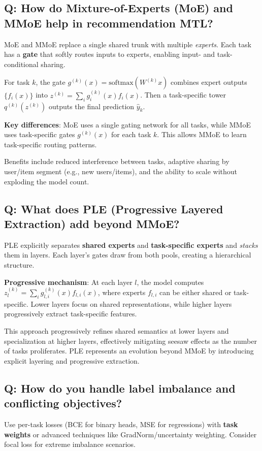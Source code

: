 \subsection*{Q: How do Mixture-of-Experts (MoE) and MMoE help in recommendation MTL?}
MoE and MMoE replace a single shared trunk with multiple \emph{experts}. Each task has a \textbf{gate} that softly routes inputs to experts, enabling input- and task-conditional sharing.

For task $k$, the gate $g^{(k)}(x)=\mathrm{softmax}(W^{(k)}x)$ combines expert outputs $\{f_i(x)\}$ into $z^{(k)}=\sum_i g^{(k)}_i(x) f_i(x)$. Then a task-specific tower $q^{(k)}(z^{(k)})$ outputs the final prediction $\hat y_k$.

\textbf{Key differences}: MoE uses a single gating network for all tasks, while MMoE uses task-specific gates $g^{(k)}(x)$ for each task $k$. This allows MMoE to learn task-specific routing patterns.

Benefits include reduced interference between tasks, adaptive sharing by user/item segment (e.g., new users/items), and the ability to scale without exploding the model count.

\subsection*{Q: What does PLE (Progressive Layered Extraction) add beyond MMoE?}
PLE explicitly separates \textbf{shared experts} and \textbf{task-specific experts} and \emph{stacks} them in layers. Each layer's gates draw from both pools, creating a hierarchical structure.

\textbf{Progressive mechanism}: At each layer $l$, the model computes $z^{(k)}_l = \sum_i g^{(k)}_{l,i}(x) f_{l,i}(x)$, where experts $f_{l,i}$ can be either shared or task-specific. Lower layers focus on shared representations, while higher layers progressively extract task-specific features.

This approach progressively refines shared semantics at lower layers and specialization at higher layers, effectively mitigating seesaw effects as the number of tasks proliferates. PLE represents an evolution beyond MMoE by introducing explicit layering and progressive extraction.

\subsection*{Q: How do you handle label imbalance and conflicting objectives?}
Use per-task losses (BCE for binary heads, MSE for regressions) with \textbf{task weights} or advanced techniques like GradNorm/uncertainty weighting. Consider focal loss for extreme imbalance scenarios.

